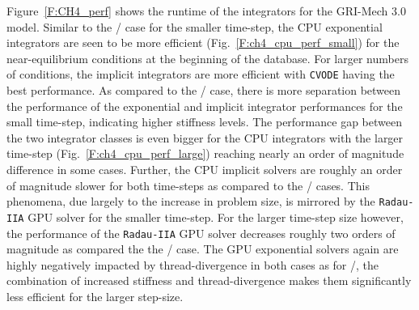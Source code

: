 \documentclass[final,twocolumn]{elsarticle}
\begin{document}
Figure~\ref{F:CH4_perf} shows the runtime of the integrators for the GRI-Mech 3.0 model.
Similar to the \slash{} case for the smaller time-step, the CPU exponential integrators are seen to be more efficient (Fig.~\ref{F:ch4_cpu_perf_small}) for the near-equilibrium conditions at the beginning of the database.
For larger numbers of conditions, the implicit integrators are more efficient with \texttt{CVODE} having the best performance.
As compared to the \slash{} case, there is more separation between the performance of the exponential and implicit integrator performances for the small time-step, indicating higher stiffness levels.
The performance gap between the two integrator classes is even bigger for the CPU integrators with the larger time-step (Fig.~\ref{F:ch4_cpu_perf_large}) reaching nearly an order of magnitude difference in some cases.
Further, the CPU implicit solvers are roughly an order of magnitude slower for both time-steps as compared to the \slash{} cases.
This phenomena, due largely to the increase in problem size, is mirrored by the \texttt{Radau-IIA} GPU solver for the smaller time-step.
For the larger time-step size however, the performance of the \texttt{Radau-IIA} GPU solver decreases roughly two orders of magnitude as compared the the \slash{} case.
The GPU exponential solvers again are highly negatively impacted by thread-divergence in both cases as for \slash{}, the combination of increased stiffness and thread-divergence makes them significantly less efficient for the larger step-size.

\end{document}
